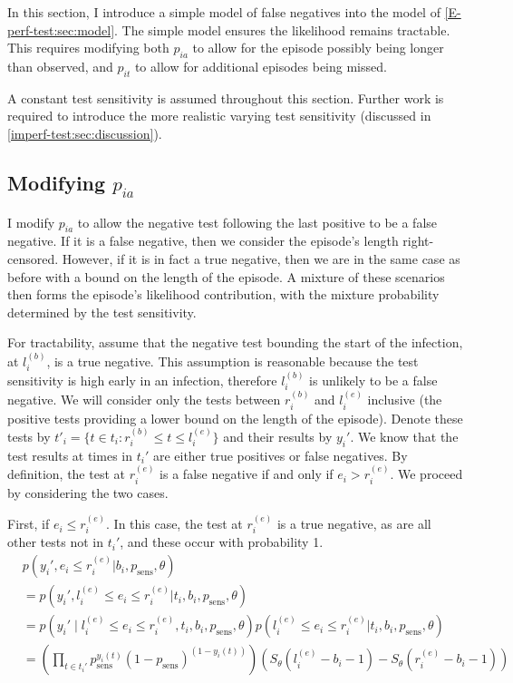 \documentclass[thesis.tex]{subfiles}
\begin{document}
In this section, I introduce a simple model of false negatives into the model of \cref{E-perf-test:sec:model}.
The simple model ensures the likelihood remains tractable.
This requires modifying both $p_{ia}$ to allow for the episode possibly being longer than observed, and $p_{it}$ to allow for additional episodes being missed.

A constant test sensitivity is assumed throughout this section.
Further work is required to introduce the more realistic varying test sensitivity (discussed in \cref{imperf-test:sec:discussion}).

\subsection{Modifying \texorpdfstring{$p_{ia}$}{pia}} \label{modifying-p_ia}

I modify $p_{ia}$ to allow the negative test following the last positive to be a false negative.
If it is a false negative, then we consider the episode's length right-censored.
However, if it is in fact a true negative, then we are in the same case as before with a bound on the length of the episode.
A mixture of these scenarios then forms the episode's likelihood contribution, with the mixture probability determined by the test sensitivity.

For tractability, assume that the negative test bounding the start of the infection, at $l_i^{(b)}$, is a true negative.
This assumption is reasonable because the test sensitivity is high early in an infection, therefore $l_i^{(b)}$ is unlikely to be a false negative.
We will consider only the tests between $r_i^{(b)}$ and $l_i^{(e)}$ inclusive (the positive tests providing a lower bound on the length of the episode).
Denote these tests by $t'_i = \{ t \in t_i : r_i^{(b)} \leq t \leq l_i^{(e)} \}$ and their results by $y_i'$.
We know that the test results at times in $t_i'$ are either true positives or false negatives. 
By definition, the test at $r_i^{(e)}$ is a false negative if and only if $e_i > r_i^{(e)}$.
We proceed by considering the two cases.

First, if $e_i \leq r_i^{(e)}$.
In this case, the test at $r_i^{(e)}$ is a true negative, as are all other tests not in $t_i'$, and these occur with probability 1.
\begin{align}
&p(y_i', e_i \leq r_i^{(e)} | b_i, p_\text{sens}, \theta) \\
&= p(y_i', l_i^{(e)} \leq e_i \leq r_i^{(e)} | t_i, b_i, p_\text{sens}, \theta) \\ %
&= p(y_i' \mid l_i^{(e)} \leq e_i \leq r_i^{(e)}, t_i, b_i, p_\text{sens}, \theta) p(l_i^{(e)} \leq e_i \leq r_i^{(e)} | t_i, b_i, p_\text{sens}, \theta) \\
&= \left( \prod_{t \in t_i'} p_\text{sens}^{y_i(t)} (1 - p_\text{sens})^{(1 - y_i(t))} \right) \left( S_\theta(l_i^{(e)} - b_i - 1) - S_\theta(r_i^{(e)} - b_i - 1) \right)
\end{align}
\end{document}
